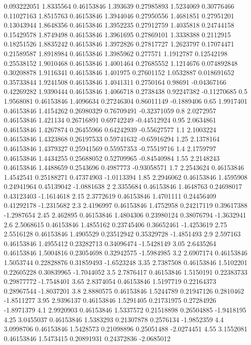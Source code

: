 \documentclass[compact]{ne630handout}
\begin{document}
{0.093222051 1.8335564 0.46153846 1.393639 0.27985893 1.5234069 0.30776466
0.11027163 1.8515763 0.46153846 1.3944046 0.27950556 1.4681851 0.27951201
0.13043944 1.8648356 0.46153846 1.3952235 0.27912759 1.4035818 0.24744158
0.15429578 1.8749498 0.46153846 1.3961695 0.27869101 1.3338388 0.2112915
0.18251526 1.8835242 0.46153846 1.3972826 0.27817727 1.2623797 0.17074471
0.21589587 1.8918984 0.46153846 1.3985962 0.277571 1.1912787 0.12542198
0.25538152 1.9010468 0.46153846 1.4001464 0.27685552 1.1214676 0.074892848
0.30208878 1.9116341 0.46153846 1.401975 0.27601152 1.0532887 0.018691652
0.35733844 1.9241508 0.46153846 1.4041311 0.2750164 0.98691 -0.04367166
0.42269282 1.9390444 0.46153846 1.4066718 0.2738438 0.92247382 -0.11270685
0.5 1.9568081 0.46153846 1.4096634 0.27246304 0.86011149 -0.1889406
0.65 1.9917401 0.46153846 1.4154262 0.26980329 0.76709491 -0.32371059
0.8 2.0272957 0.46153846 1.421134 0.26716891 0.69742249 -0.44512924
0.95 2.0634861 0.46153846 1.4267874 0.26455966 0.64242939 -0.55627577
1.1 2.1003224 0.46153846 1.4323868 0.26197533 0.59741632 -0.65916294
1.25 2.1378164 0.46153846 1.4379327 0.25941569 0.55957353 -0.75519716
1.4 2.1759797 0.46153846 1.4434255 0.25688052 0.52709965 -0.84540984
1.55 2.2148243 0.46153846 1.4488659 0.2543696 0.4987773 -0.93058571
1.7 2.2543624 0.46153846 1.4542541 0.25188271 0.47374903 -1.0113394
1.85 2.2946062 0.46153846 1.4595908 0.24941964 0.45139042 -1.0881638
2 2.3355684 0.46153846 1.4648763 0.24698017 0.43123403 -1.1614618
2.15 2.3772619 0.46153846 1.4701111 0.24456409 0.41292178 -1.2315682
2.3 2.4196997 0.46153846 1.4752958 0.24217119 0.39617388 -1.2987654
2.45 2.462895 0.46153846 1.4804306 0.23980124 0.38076794 -1.3632941
2.6 2.5068615 0.46153846 1.4855162 0.23745406 0.36652461 -1.4253619
2.75 2.5516128 0.46153846 1.4905529 0.23512942 0.35329728 -1.4851493
2.9 2.597163 0.46153846 1.4955412 0.23282713 0.34096474 -1.5428149
3.05 2.6435264 0.46153846 1.5004816 0.23054698 0.32942575 -1.5984985
3.2 2.6907174 0.46153846 1.5053744 0.22828876 0.31859493 -1.6523248
3.35 2.7387508 0.46153846 1.5102201 0.22605228 0.30839965 -1.7044052
3.5 2.7876417 0.46153846 1.5150191 0.22383733 0.29877772 -1.7548401
3.65 2.8374054 0.46153846 1.5197719 0.22164373 0.28967544 -1.8037201
3.8 2.8880575 0.46153846 1.5244789 0.21947126 0.2810462 -1.8511277
3.95 2.9396137 0.46153846 1.5291405 0.21731975 0.27284926 -1.8971379
4.1 2.9920903 0.46153846 1.5337572 0.21518898 0.26504885 -1.9418195
4.25 3.0455037 0.46153846 1.5383293 0.21307878 0.2576134 -1.9852359
4.4 3.0998706 0.46153846 1.5428573 0.21098896 0.25051488 -2.0274451
4.55 3.1552081 0.46153846 1.5473415 0.20891931 0.24372836 -2.0685012
}
\end{document}
